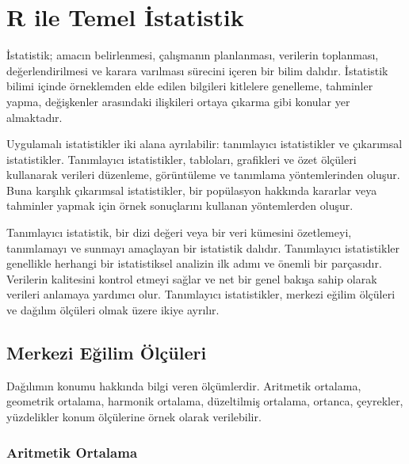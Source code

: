 \documentclass[
  letterpaper,
  DIV=11,
  numbers=noendperiod]{scrreprt}
\begin{document}

\chapter*{R ile Temel İstatistik}\label{r-ile-temel-istatistik}


İstatistik; amacın belirlenmesi, çalışmanın planlanması, verilerin
toplanması, değerlendirilmesi ve karara varılması sürecini içeren bir
bilim dalıdır. İstatistik bilimi içinde örneklemden elde edilen
bilgileri kitlelere genelleme, tahminler yapma, değişkenler arasındaki
ilişkileri ortaya çıkarma gibi konular yer almaktadır.

Uygulamalı istatistikler iki alana ayrılabilir: tanımlayıcı
istatistikler ve çıkarımsal istatistikler. Tanımlayıcı istatistikler,
tabloları, grafikleri ve özet ölçüleri kullanarak verileri düzenleme,
görüntüleme ve tanımlama yöntemlerinden oluşur. Buna karşılık çıkarımsal
istatistikler, bir popülasyon hakkında kararlar veya tahminler yapmak
için örnek sonuçlarını kullanan yöntemlerden oluşur.

Tanımlayıcı istatistik, bir dizi değeri veya bir veri kümesini
özetlemeyi, tanımlamayı ve sunmayı amaçlayan bir istatistik dalıdır.
Tanımlayıcı istatistikler genellikle herhangi bir istatistiksel analizin
ilk adımı ve önemli bir parçasıdır. Verilerin kalitesini kontrol etmeyi
sağlar ve net bir genel bakışa sahip olarak verileri anlamaya yardımcı
olur. Tanımlayıcı istatistikler, merkezi eğilim ölçüleri ve dağılım
ölçüleri olmak üzere ikiye ayrılır.

\section*{Merkezi Eğilim
Ölçüleri}\label{merkezi-eux11filim-uxf6luxe7uxfcleri}


Dağılımın konumu hakkında bilgi veren ölçümlerdir. Aritmetik ortalama,
geometrik ortalama, harmonik ortalama, düzeltilmiş ortalama, ortanca,
çeyrekler, yüzdelikler konum ölçülerine örnek olarak verilebilir.

\subsection*{Aritmetik Ortalama}\label{aritmetik-ortalama}
\end{document}
